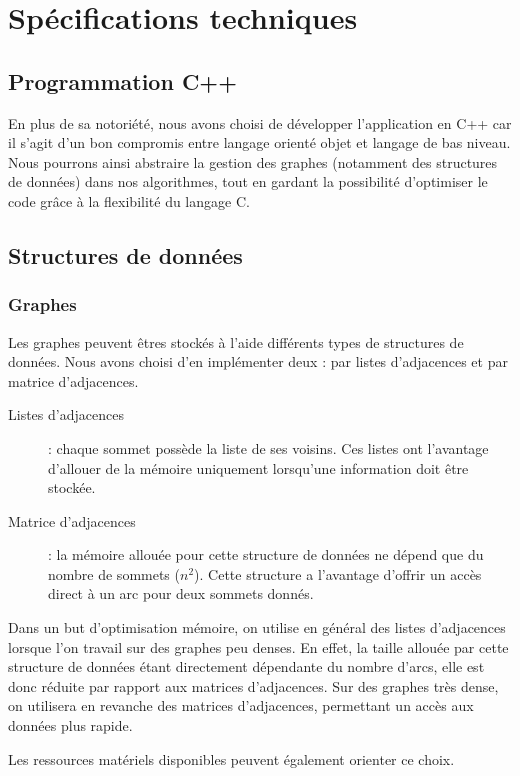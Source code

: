 \section{Spécifications techniques}

\subsection{Programmation C++}
En plus de sa notoriété, nous avons choisi de développer l'application en C++ car il s'agit d'un bon compromis entre langage orienté objet et langage de bas niveau. Nous pourrons ainsi abstraire la gestion des graphes (notamment des structures de données) dans nos algorithmes, tout en gardant la possibilité d'optimiser le code grâce à la flexibilité du langage C.

\subsection{Structures de données}

\subsubsection{Graphes}
Les graphes peuvent êtres stockés à l'aide différents types de structures de données. Nous avons choisi d'en implémenter deux :  par listes d'adjacences et par matrice d'adjacences.
\begin{description}
\item[Listes d'adjacences] : chaque sommet possède la liste de ses voisins. Ces listes ont l'avantage d'allouer de la mémoire uniquement lorsqu'une information doit être stockée. 
\item[Matrice d'adjacences] : la mémoire allouée pour cette structure de données ne dépend que du nombre de sommets ($n^2$). Cette structure a l'avantage d'offrir un accès direct à un arc pour deux sommets donnés.
\end{description}

Dans un but d'optimisation mémoire, on utilise en général des listes d'adjacences lorsque l'on travail sur des graphes peu denses. En effet, la taille allouée par cette structure de données étant directement dépendante du nombre d'arcs, elle est donc réduite par rapport aux matrices d'adjacences. Sur des graphes très dense, on utilisera en revanche des matrices d'adjacences, permettant un accès aux données plus rapide. 

Les ressources matériels disponibles peuvent également orienter ce choix.

